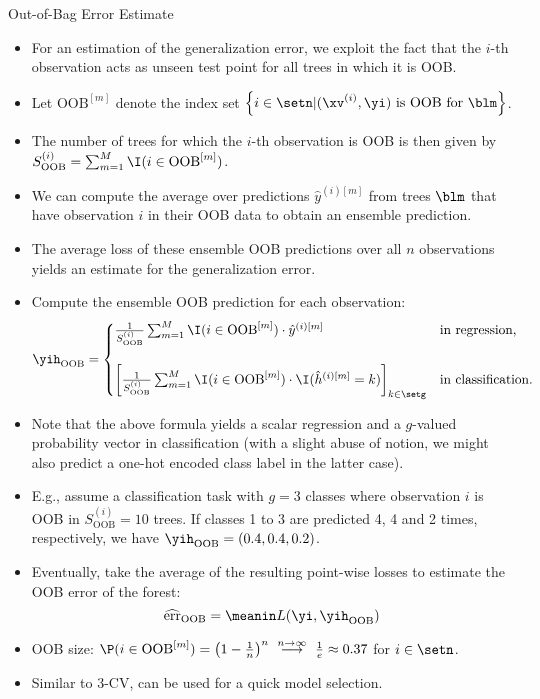 \documentclass[11pt,compress,t,notes=noshow, xcolor=table]{beamer}
\begin{document}
\begin{vbframe}{Out-of-Bag Error Estimate}
\begin{itemize}
  \item For an estimation of the generalization error, we exploit the 
  fact that the $i$-th observation acts as unseen test point for all trees in 
  which it is OOB. 
  \item Let $\text{OOB}^{[m]}$ denote the index set 
  $\left \{i \in \setn | (\xv^{(i)}, \yi) \text{ is OOB for } \blm \right \}$.
  \item The number of trees for which the $i$-th observation is OOB is then 
  given by $S_{\text{OOB}}^{(i)} = 
  \sum_{m = 1}^M \I(i \in \text{OOB}^{[m]})$.
  \item We can compute the average over predictions $\hat{y}^{(i)[m]}$ from 
  trees $\blm$ that have observation $i$ in their OOB data to obtain an 
  ensemble prediction.
  \item The average loss of these ensemble OOB predictions over all $n$ 
  observations yields an estimate for the generalization error.
  \item Compute the ensemble OOB prediction for each observation:
  $$\yih_{\text{OOB}} = \begin{cases}
  \frac{1}{S_{\text{OOB}}^{(i)}} \sum_{m = 1}^{M} 
  \I(i \in \text{OOB}^{[m]}) \cdot \hat{y}^{(i)[m]}
  & \text{in regression,} 
  \\ \phantom{x} \\
  \left[
  \frac{1}{S_{\text{OOB}}^{(i)}} \sum_{m = 1}^{M} \I(i \in \text{OOB}^{[m]}) 
  \cdot \I(\hat{h}^{(i)[m]} = k) \right]_{k \in \setg} &
  \text{in classification.}
  \end{cases}$$
  \item Note that the above formula yields a scalar regression and 
  a $g$-valued probability vector in classification (with a 
  slight abuse of notion, we might also predict a one-hot encoded class label in 
  the latter case).
  \item E.g., assume a classification task with $g = 3$ classes where 
  observation $i$ is OOB in $S_{\text{OOB}}^{(i)} = 10$ trees. If classes 1 to 
  3 are predicted 4, 4 and 2 times, respectively, we have 
  $\yih_{\text{OOB}} = (0.4, 0.4, 0.2)$.
  \item Eventually, take the average of the resulting point-wise losses to 
  estimate the OOB error of the forest:
  $$\widehat{\text{err}}_{\text{OOB}} = \meanin L(\yi, \yih_{\text{OOB}})$$
  \item OOB size: $\P(i \in \text{OOB}^{[m]}) = \left(1 - \frac{1}{n}\right)^n 
  \ \stackrel{n \to \infty}{\longrightarrow} \ \frac{1}{e} \approx 0.37$ for 
  $i \in \setn$.
  \item Similar to 3-CV, can be used for a quick model selection.
\end{itemize}



\end{vbframe}

\endlecture
\end{document}
